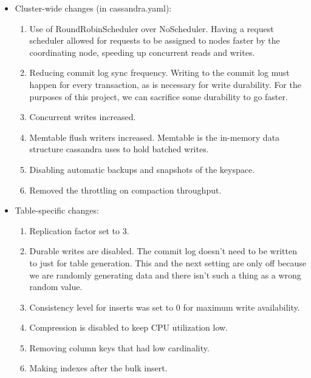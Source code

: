 \documentclass[letterpaper]{article}
\begin{document}
\begin{itemize}
	\item Cluster-wide changes (in cassandra.yaml):
		\begin{enumerate}
			\item Use of RoundRobinScheduler over NoScheduler.
				Having a request scheduler allowed for requests
				to be assigned to nodes faster by the
				coordinating node, speeding up
				concurrent reads and writes.
			\item Reducing commit log sync frequency. Writing to
				the commit log must happen for every
				transaction, as is necessary for write
				durability. For the purposes of this project,
				we can sacrifice some durability to go faster.
			\item Concurrent writes increased.
			\item Memtable flush writers increased. Memtable is the
				in-memory data structure cassandra uses to hold
				batched writes.
			\item Disabling automatic backups and snapshots of the
				keyspace. 
			\item Removed the throttling on compaction throughput.

		\end{enumerate}
	\item Table-specific changes:
		\begin{enumerate}
			\item Replication factor set to 3.
			\item Durable writes are disabled. The commit log
				doesn't need to be written to just for table
				generation. This and the next setting are only
				off because we are randomly generating data and
				there isn't such a thing as a wrong random
				value.
			\item Consistency level for inserts was set to 0 for
				maximum write availability.
			\item Compression is disabled to keep CPU utilization low.
			\item Removing column keys that had low cardinality.
			\item Making indexes after the bulk insert.
		\end{enumerate}
\end{itemize}
\end{document}
